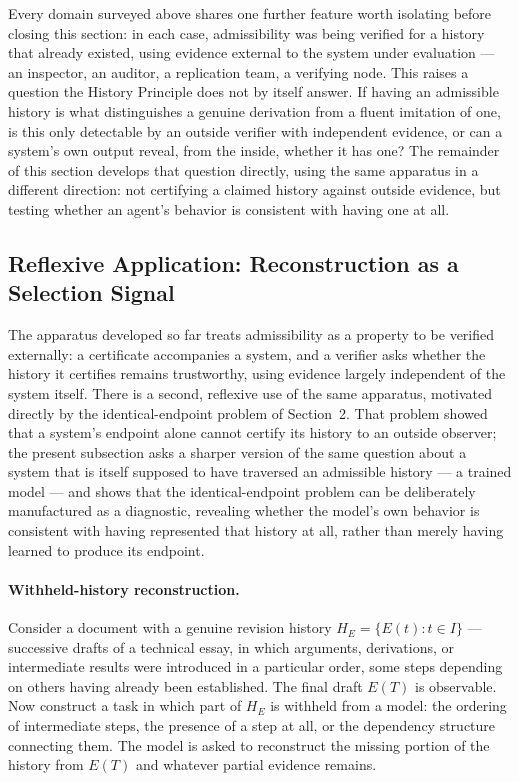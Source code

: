 \documentclass[11pt]{article}
\begin{document}
Every domain surveyed above shares one further feature worth isolating before closing this section: in each case, admissibility was being verified for a history that already existed, using evidence external to the system under evaluation --- an inspector, an auditor, a replication team, a verifying node. This raises a question the History Principle does not by itself answer. If having an admissible history is what distinguishes a genuine derivation from a fluent imitation of one, is this only detectable by an outside verifier with independent evidence, or can a system's own output reveal, from the inside, whether it has one? The remainder of this section develops that question directly, using the same apparatus in a different direction: not certifying a claimed history against outside evidence, but testing whether an agent's behavior is consistent with having one at all.

\subsection{Reflexive Application: Reconstruction as a Selection Signal}

The apparatus developed so far treats admissibility as a property to be verified externally: a certificate accompanies a system, and a verifier asks whether the history it certifies remains trustworthy, using evidence largely independent of the system itself. There is a second, reflexive use of the same apparatus, motivated directly by the identical-endpoint problem of Section~2. That problem showed that a system's endpoint alone cannot certify its history to an outside observer; the present subsection asks a sharper version of the same question about a system that is itself supposed to have traversed an admissible history --- a trained model --- and shows that the identical-endpoint problem can be deliberately manufactured as a diagnostic, revealing whether the model's own behavior is consistent with having represented that history at all, rather than merely having learned to produce its endpoint.

\paragraph{Withheld-history reconstruction.} Consider a document with a genuine revision history $H_E = \{E(t) : t \in I\}$ --- successive drafts of a technical essay, in which arguments, derivations, or intermediate results were introduced in a particular order, some steps depending on others having already been established. The final draft $E(T)$ is observable. Now construct a task in which part of $H_E$ is withheld from a model: the ordering of intermediate steps, the presence of a step at all, or the dependency structure connecting them. The model is asked to reconstruct the missing portion of the history from $E(T)$ and whatever partial evidence remains.
\end{document}
